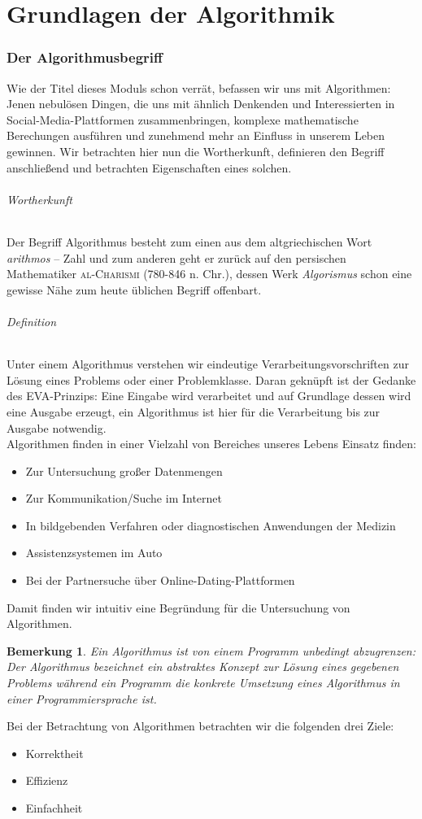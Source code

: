 \documentclass[11pt,a4paper]{scrartcl}
\newtheorem{note}{Bemerkung}
\begin{document}
\part{Grundlagen der Algorithmik}
\section{Der Algorithmusbegriff}
Wie der Titel dieses Moduls schon verrät, befassen wir uns mit Algorithmen: Jenen nebulösen Dingen, die uns mit ähnlich Denkenden und Interessierten in Social-Media-Plattformen zusammenbringen, komplexe mathematische Berechungen ausführen und zunehmend mehr an Einfluss in unserem Leben gewinnen. Wir betrachten hier nun die Wortherkunft, definieren den Begriff anschließend und betrachten Eigenschaften eines solchen.
\paragraph{Wortherkunft}
Der Begriff {\glqq}Algorithmus{\grqq} besteht zum einen aus dem altgriechischen Wort \textit{arithmos} -- Zahl und zum anderen geht er zurück auf den persischen Mathematiker \textsc{al-Charismi} (780-846 n. Chr.), dessen Werk \textit{{\glqq}Algorismus{\grqq}} schon eine gewisse Nähe zum heute üblichen Begriff offenbart. \parencite{brockhaus:algorithmus}
\paragraph{Definition}
Unter einem Algorithmus verstehen wir eindeutige Verarbeitungsvorschriften zur Lösung eines Problems oder einer Problemklasse. Daran geknüpft ist der Gedanke des EVA-Prinzips: Eine Eingabe wird verarbeitet und auf Grundlage dessen wird eine Ausgabe erzeugt, ein Algorithmus ist hier für die Verarbeitung bis zur Ausgabe notwendig. \\
Algorithmen finden in einer Vielzahl von Bereiches unseres Lebens Einsatz finden: 
\begin{itemize}
\item Zur Untersuchung großer Datenmengen
\item Zur Kommunikation/Suche im Internet
\item In bildgebenden Verfahren oder diagnostischen Anwendungen der Medizin
\item Assistenzsystemen im Auto
\item Bei der Partnersuche über Online-Dating-Plattformen
\end{itemize}
Damit finden wir intuitiv eine Begründung für die Untersuchung von Algorithmen.
\begin{note}
Ein \textit{Algorithmus} ist von einem \textit{Programm} unbedingt abzugrenzen: Der Algorithmus bezeichnet ein abstraktes Konzept zur Lösung eines gegebenen Problems während ein Programm die konkrete Umsetzung eines Algorithmus in einer Programmiersprache ist. 
\end{note}
Bei der Betrachtung von Algorithmen betrachten wir die folgenden drei Ziele:
\begin{itemize}
\item Korrektheit
\item Effizienz
\item Einfachheit
\end{itemize}
\end{document}
